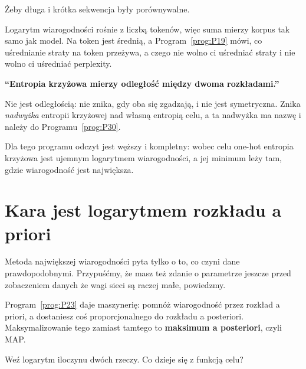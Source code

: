 \begin{fr}
\begin{ansblock}
Żeby długa i krótka sekwencja były porównywalne.
\end{ansblock}

Logarytm wiarogodności rośnie z liczbą tokenów, więc suma mierzy korpus tak
samo jak model. Na token jest średnią, a Program~\ref{prog:P19} mówi, co
uśrednianie straty na token przeżywa, a czego nie \dash{} wolno ci uśredniać
straty i nie wolno ci uśredniać perplexity.

\begin{trapbox}
\textbf{\enquote{Entropia krzyżowa mierzy odległość między dwoma
rozkładami.}}

Nie jest odległością: nie znika, gdy oba się zgadzają, i nie jest
symetryczna. Znika \emph{nadwyżka} entropii krzyżowej nad własną entropią
celu, a ta nadwyżka ma nazwę i należy do Programu~\ref{prog:P30}.

Dla tego programu odczyt jest węższy i kompletny: wobec celu one-hot entropia
krzyżowa jest ujemnym logarytmem wiarogodności, a jej minimum leży tam, gdzie
wiarogodność jest największa.
\end{trapbox}
\end{fr}

\section{Kara jest logarytmem rozkładu a priori}
\label{sec:P26-prior}

\begin{fr}
Metoda największej wiarogodności pyta tylko o to, co czyni dane
prawdopodobnymi. Przypuśćmy, że masz też zdanie o parametrze jeszcze przed
zobaczeniem danych \dash{} że wagi sieci są raczej małe, powiedzmy.

Program~\ref{prog:P23} daje maszynerię: pomnóż wiarogodność przez rozkład a
priori, a dostaniesz coś proporcjonalnego do rozkładu a posteriori.
Maksymalizowanie tego zamiast tamtego to \textbf{maksimum a posteriori},
czyli MAP.

Weź logarytm iloczynu dwóch rzeczy. Co dzieje się z funkcją celu?
\dotline
\nextframe
\end{fr}

